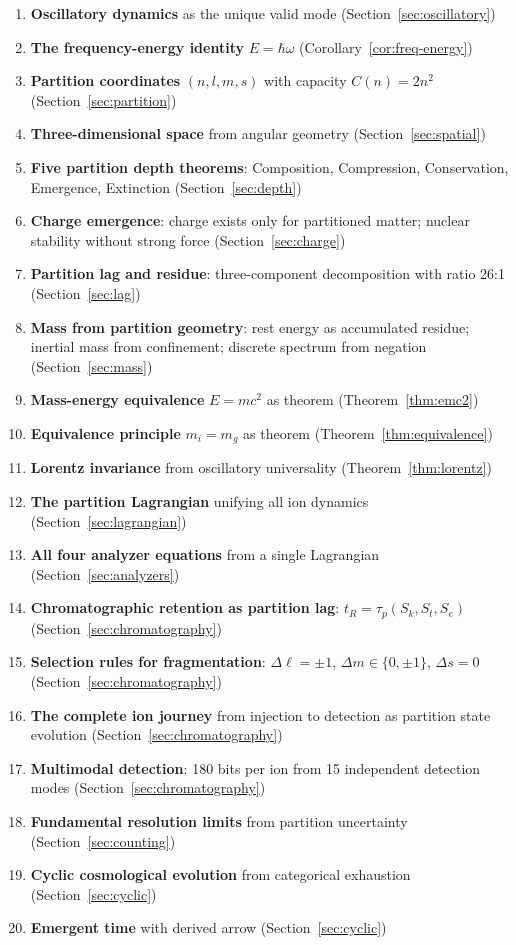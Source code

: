 \documentclass[twocolumn,10pt,a4paper]{article}
\theoremstyle{definition}
\theoremstyle{remark}
\newcommand{\taup}{\tau_p}
\begin{document}
\begin{enumerate}
    \item \textbf{Oscillatory dynamics} as the unique valid mode (Section~\ref{sec:oscillatory})
    \item \textbf{The frequency-energy identity} $E = \hbar\omega$ (Corollary~\ref{cor:freq-energy})
    \item \textbf{Partition coordinates} $(n, l, m, s)$ with capacity $C(n) = 2n^2$ (Section~\ref{sec:partition})
    \item \textbf{Three-dimensional space} from angular geometry (Section~\ref{sec:spatial})
    \item \textbf{Five partition depth theorems}: Composition, Compression, Conservation, Emergence, Extinction (Section~\ref{sec:depth})
    \item \textbf{Charge emergence}: charge exists only for partitioned matter; nuclear stability without strong force (Section~\ref{sec:charge})
    \item \textbf{Partition lag and residue}: three-component decomposition with ratio 26:1 (Section~\ref{sec:lag})
    \item \textbf{Mass from partition geometry}: rest energy as accumulated residue; inertial mass from confinement; discrete spectrum from negation (Section~\ref{sec:mass})
    \item \textbf{Mass-energy equivalence} $E = mc^2$ as theorem (Theorem~\ref{thm:emc2})
    \item \textbf{Equivalence principle} $m_i = m_g$ as theorem (Theorem~\ref{thm:equivalence})
    \item \textbf{Lorentz invariance} from oscillatory universality (Theorem~\ref{thm:lorentz})
    \item \textbf{The partition Lagrangian} unifying all ion dynamics (Section~\ref{sec:lagrangian})
    \item \textbf{All four analyzer equations} from a single Lagrangian (Section~\ref{sec:analyzers})
    \item \textbf{Chromatographic retention as partition lag}: $t_R = \taup(S_k, S_t, S_e)$ (Section~\ref{sec:chromatography})
    \item \textbf{Selection rules for fragmentation}: $\Delta\ell = \pm 1$, $\Delta m \in \{0, \pm 1\}$, $\Delta s = 0$ (Section~\ref{sec:chromatography})
    \item \textbf{The complete ion journey} from injection to detection as partition state evolution (Section~\ref{sec:chromatography})
    \item \textbf{Multimodal detection}: 180 bits per ion from 15 independent detection modes (Section~\ref{sec:chromatography})
    \item \textbf{Fundamental resolution limits} from partition uncertainty (Section~\ref{sec:counting})
    \item \textbf{Cyclic cosmological evolution} from categorical exhaustion (Section~\ref{sec:cyclic})
    \item \textbf{Emergent time} with derived arrow (Section~\ref{sec:cyclic})
\end{enumerate}
\end{document}
